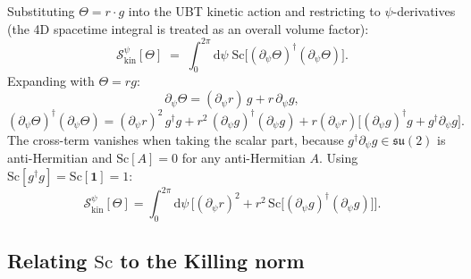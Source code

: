 \documentclass[11pt,a4paper]{article}
\theoremstyle{definition}
\theoremstyle{remark}
\begin{document}
Substituting $\Theta = r \cdot g$ into the UBT kinetic action and
restricting to $\psi$-derivatives (the 4D spacetime integral is treated
as an overall volume factor):
\begin{equation}
  \mathcal{S}_{\mathrm{kin}}^\psi[\Theta]
  \;=\; \int_0^{2\pi} \mathrm{d}\psi\;
    \mathrm{Sc}\bigl[(\partial_\psi\Theta)^\dagger(\partial_\psi\Theta)\bigr].
  \label{eq:S_kin_psi}
\end{equation}
Expanding with $\Theta = r g$:
\begin{equation}
  \partial_\psi\Theta = (\partial_\psi r)\,g + r\,\partial_\psi g,
  \label{eq:dTheta_expand}
\end{equation}
\begin{equation}
  (\partial_\psi\Theta)^\dagger(\partial_\psi\Theta)
  = (\partial_\psi r)^2\, g^\dagger g
  + r^2\, (\partial_\psi g)^\dagger(\partial_\psi g)
  + r(\partial_\psi r)\bigl[(\partial_\psi g)^\dagger g + g^\dagger\partial_\psi g\bigr].
  \label{eq:dTheta_sq}
\end{equation}
The cross-term vanishes when taking the scalar part, because
$g^\dagger \partial_\psi g \in \mathfrak{su}(2)$ is anti-Hermitian and
$\mathrm{Sc}[A] = 0$ for any anti-Hermitian $A$.
Using $\mathrm{Sc}[g^\dagger g] = \mathrm{Sc}[\mathbf{1}] = 1$:
\begin{equation}
  \mathcal{S}_{\mathrm{kin}}^\psi[\Theta]
  = \int_0^{2\pi} \mathrm{d}\psi\,\bigl[(\partial_\psi r)^2
  + r^2\,\mathrm{Sc}\bigl[(\partial_\psi g)^\dagger(\partial_\psi g)\bigr]\bigr].
  \label{eq:S_kin_split}
\end{equation}

\subsection{Relating \texorpdfstring{$\mathrm{Sc}$}{Sc} to the Killing norm}
\label{subsec:Sc_to_Tr}
\end{document}

